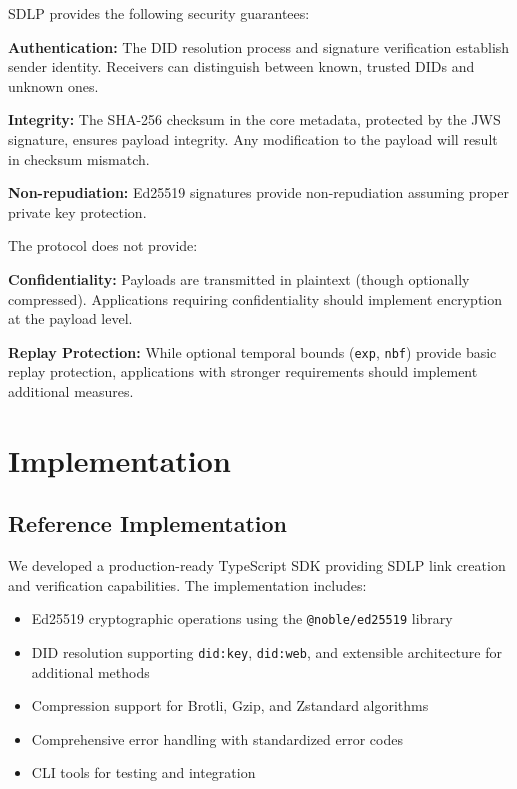 \documentclass[conference]{IEEEtran}
\begin{document}
SDLP provides the following security guarantees:

\textbf{Authentication:} The DID resolution process and signature verification establish sender identity. Receivers can distinguish between known, trusted DIDs and unknown ones.

\textbf{Integrity:} The SHA-256 checksum in the core metadata, protected by the JWS signature, ensures payload integrity. Any modification to the payload will result in checksum mismatch.

\textbf{Non-repudiation:} Ed25519 signatures provide non-repudiation assuming proper private key protection.

The protocol does not provide:

\textbf{Confidentiality:} Payloads are transmitted in plaintext (though optionally compressed). Applications requiring confidentiality should implement encryption at the payload level.

\textbf{Replay Protection:} While optional temporal bounds (\texttt{exp}, \texttt{nbf}) provide basic replay protection, applications with stronger requirements should implement additional measures.

\section{Implementation}

\subsection{Reference Implementation}

We developed a production-ready TypeScript SDK providing SDLP link creation and verification capabilities. The implementation includes:

\begin{itemize}
    \item Ed25519 cryptographic operations using the \texttt{@noble/ed25519} library
    \item DID resolution supporting \texttt{did:key}, \texttt{did:web}, and extensible architecture for additional methods
    \item Compression support for Brotli, Gzip, and Zstandard algorithms
    \item Comprehensive error handling with standardized error codes
    \item CLI tools for testing and integration
\end{itemize}
\end{document}
